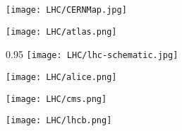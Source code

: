 \begin{minipagewithmarginpars}[h]{\textwidth}
  	\centering
	\texttt{[image: LHC/CERNMap.jpg]}
  	\label{lhcschema}
  	\par 	
\marginpar
{
	\texttt{[image: LHC/atlas.png]}
    	\label{atlas}
}
\end{minipagewithmarginpars}

\begin{minipagewithmarginpars}[h]{0.95\textwidth}
  	\centering
	\texttt{[image: LHC/lhc-schematic.jpg]}
  	\label{octants}	
  	\par 	
\marginpar
{
    \vspace*{-7.5cm}
	\texttt{[image: LHC/alice.png]}
    	\label{alice}
}
\end{minipagewithmarginpars}
\marginpar
{
	\texttt{[image: LHC/cms.png]}
    	\label{cms}
}
\marginpar
{
	
	\texttt{[image: LHC/lhcb.png]}
    	\label{lhcb}
}